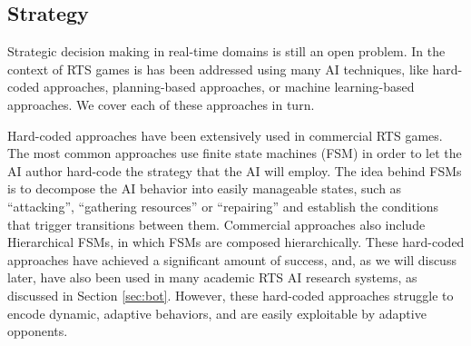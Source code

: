 \documentclass[journal]{IEEEtran}
\begin{document}


\subsection{Strategy}

Strategic decision making in real-time domains is still an open problem. In the context of RTS games is has been addressed using many AI techniques, like hard-coded approaches, planning-based approaches, or machine learning-based approaches. We cover each of these approaches in turn.

Hard-coded approaches have been extensively used in commercial RTS games. The most common approaches use finite state machines (FSM) \cite{FSM_AIGameProgWisdom2003} in order to let the AI author hard-code the strategy that the AI will employ. The idea behind FSMs is to decompose the AI behavior into easily manageable states, such as ``attacking'', ``gathering resources'' or ``repairing'' and establish the conditions that trigger transitions between them. Commercial approaches also include Hierarchical FSMs, in which FSMs are composed hierarchically. These hard-coded approaches have achieved a significant amount of success, and, as we will discuss later, have also been used in many academic RTS AI research systems, as discussed in Section \ref{sec:bot}. However, these hard-coded approaches struggle to encode dynamic, adaptive behaviors, and are easily exploitable by adaptive opponents.

\end{document}
